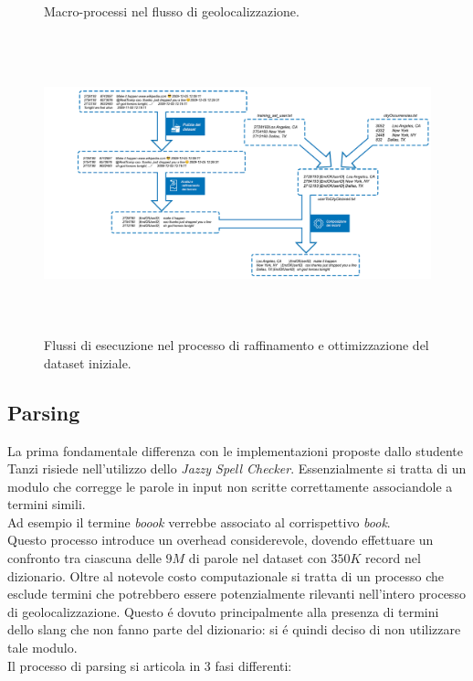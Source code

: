 \documentclass[twocolumn,10pt]{asme2ej}
\begin{document}
\begin{figure} 
\centerline{}
\caption{Macro-processi nel flusso di geolocalizzazione.}
\label{usatw.ps}
\end{figure}

\begin{figure}
  \includegraphics[width=16cm,height=8.65cm]{figure/matita2.png}
  \caption{Flussi di esecuzione nel processo di raffinamento e ottimizzazione del dataset iniziale.}
\end{figure}  


\subsection{Parsing}

La prima fondamentale differenza con le implementazioni proposte dallo studente Tanzi risiede nell'utilizzo dello \textit{Jazzy Spell Checker}. Essenzialmente si tratta  di un modulo che corregge le parole in input non scritte correttamente associandole a termini simili. \\ Ad esempio il termine \textit{boook} verrebbe associato al corrispettivo \textit{book}. \\ Questo processo  introduce un overhead considerevole, dovendo effettuare un confronto tra ciascuna delle $9 M$ di parole nel dataset con $350K$ record nel dizionario. Oltre al notevole costo computazionale si tratta di un processo che esclude termini che potrebbero essere potenzialmente rilevanti nell'intero processo di geolocalizzazione. Questo \'e dovuto principalmente alla presenza di termini dello slang che non fanno parte del dizionario: si \'e quindi deciso di non utilizzare tale modulo.\\ Il processo di parsing si articola in 3 fasi differenti:
\end{document}
